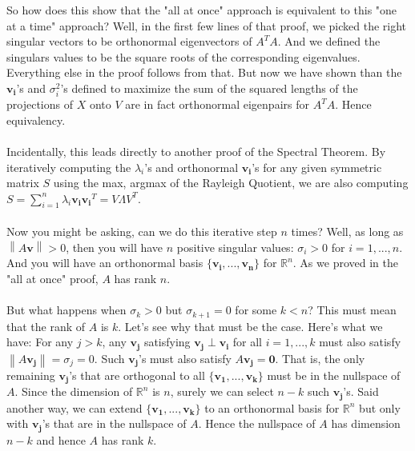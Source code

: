 \documentclass{tufte-handout}
\newcommand{\norm}[1]{\left\lVert#1\right\rVert}
\begin{document}
\noindent So how does this show that the "all at once" approach is equivalent to this "one at a time" approach? Well, in the first few lines of that proof, we picked the right singular vectors to be orthonormal eigenvectors of $A^TA$. And we defined the singulars values to be the square roots of the corresponding eigenvalues. Everything else in the proof follows from that. But now we have shown than the $\mathbf{v_i}$'s and $\sigma_{i}^2$'s defined to maximize the sum of the squared lengths of the projections of $X$ onto $V$ are in fact orthonormal eigenpairs for $A^TA$. Hence equivalency.\\\leavevmode\\

\noindent Incidentally, this leads directly to another proof of the Spectral Theorem. By iteratively computing the $\lambda_i$'s and orthonormal $\mathbf{v_i}$'s for any given symmetric matrix $S$ using the max, argmax of the Rayleigh Quotient, we are also computing $S=\sum_{i=1}^n\lambda_i\mathbf{v_i}\mathbf{v_i}^T=V\Lambda V^T$.\\\leavevmode\\

\noindent \hypertarget{btoaata}{} Now you might be asking, can we do this iterative step $n$ times? Well, as long as $\norm{A\mathbf{v}}>0$, then you will have $n$ positive singular values: $\sigma_{i}>0$ for $i=1,...,n$. And you will have an orthonormal basis $\{\mathbf{v_i},...,\mathbf{v_n}\}$ for $\mathbb{R}^n$. As we proved in the "all at once" proof, $A$ has rank $n$.\\\leavevmode\\

\noindent But what happens when $\sigma_{k}>0$ but $\sigma_{k+1}=0$ for some $k<n$? This must mean that the rank of $A$ is $k$. Let's see why that must be the case. Here's what we have: For any $j>k$, any $\mathbf{v_{j}}$ satisfying $\mathbf{v_{j}}\perp \mathbf{v_i}$ for all $i=1,...,k$ must also satisfy $\norm{A\mathbf{v_{j}}}= \sigma_{j}=0$. Such $\mathbf{v_{j}}$'s must also satisfy $A\mathbf{v_{j}}=\mathbf{0}$. That is, the only remaining $\mathbf{v_{j}}$'s that are orthogonal to all $\{\mathbf{v_1},...,\mathbf{v_k}\}$ must be in the nullspace of $A$. Since the dimension of $\mathbb{R}^n$ is $n$, surely we can select $n-k$ such $\mathbf{v_{j}}$'s. Said another way, we can extend $\{\mathbf{v_1},...,\mathbf{v_k}\}$ to an orthonormal basis for $\mathbb{R}^n$ but only with $\mathbf{v_{j}}$'s that are in the nullspace of $A$. Hence the nullspace of $A$ has dimension $n-k$ and hence $A$ has rank $k$.\\\leavevmode\\
\end{document}
